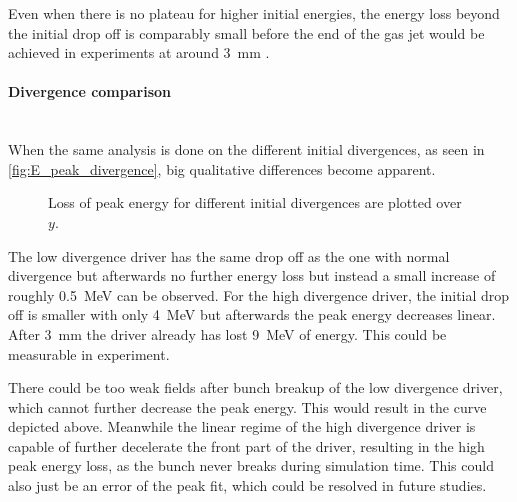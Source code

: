 \documentclass[bachelor_thesis]{subfiles}
\begin{document}
Even when there is no plateau for higher initial energies, the energy loss beyond the initial drop off is comparably small before the end of the gas jet would be achieved in experiments at around \qty{3}{\mm} \cite{Schoebel2022}.

\paragraph*{Divergence comparison}\hspace{0pt} \\
When the same analysis is done on the different initial divergences, as seen in \autoref{fig:E_peak_divergence}, big qualitative differences become apparent. 
\begin{figure}
	\centering
	
	\caption{Loss of peak energy for different initial divergences are plotted over $y$.}
	\label{fig:E_peak_divergence}
\end{figure}
The low divergence driver has the same drop off as the one with normal divergence but afterwards no further energy loss but instead a small increase of roughly \qty{0.5}{\MeV} can be observed.
For the high divergence driver, the initial drop off is smaller with only \qty{4}{\MeV} but afterwards the peak energy decreases linear. After \qty{3}{\mm} the driver already has lost \qty{9}{\MeV} of energy. This could be measurable in experiment.

There could be too weak fields after bunch breakup of the low divergence driver, which cannot further decrease the peak energy. This would result in the curve depicted above. 
Meanwhile the linear regime of the high divergence driver is capable of further decelerate the front part of the driver, resulting in the high peak energy loss, as the bunch never breaks during simulation time. 
This could also just be an error of the peak fit, which could be resolved in future studies.
\end{document}
